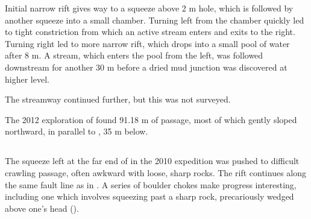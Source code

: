 Initial narrow rift gives way to a squeeze above 2 m hole, which is
followed by another squeeze into a small chamber. Turning left from the
chamber quickly led to tight constriction from which an active stream
enters and exits to the right. Turning right led to more narrow rift,
which drops into a small pool of water after 8 m. A stream, which enters
the pool from the left, was followed downstream for another 30 m before
a dried mud junction was discovered at higher level.

The streamway continued further, but this was not surveyed.

The 2012 exploration of  found 91.18 m of passage, most
of which gently sloped northward, in parallel to , 35 m below.


\subsection{}

The squeeze left at the far end of  in the 2010
expedition was pushed to difficult crawling passage, often awkward with
loose, sharp rocks. The rift continues along the same fault line as in
. A series of boulder chokes make progress
interesting, including one which involves squeezing past a sharp rock,
precariously wedged above one's head ().

